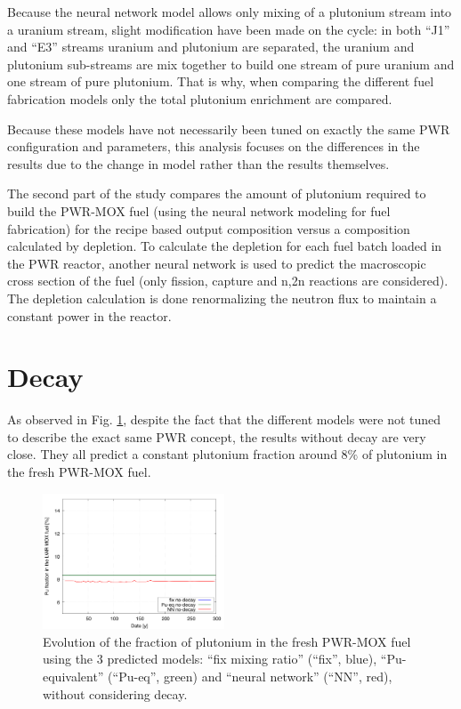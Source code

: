 \documentclass{anstrans}
\begin{document}
Because the neural network model allows only mixing of a plutonium stream into a
uranium stream, slight modification have been made on the cycle: in both ``J1''
and ``E3'' streams uranium and plutonium are separated, the uranium and
plutonium sub-streams are mix together to build one stream of pure uranium and
one stream of pure plutonium. That is why, when comparing the different fuel
fabrication models only the total plutonium enrichment are compared. 

Because these models have not necessarily been tuned on exactly the same
PWR configuration and parameters, this analysis focuses on the differences
in the results due to the change in model rather than the results themselves.

The second part of the study compares the amount of plutonium required to build
the PWR-MOX fuel (using the neural network modeling for fuel fabrication) for
the recipe based output composition versus a composition calculated by
depletion.  To calculate the depletion for each fuel batch loaded in the PWR
reactor, another neural network is used to predict the macroscopic cross section
of the fuel \cite{Leniau2015125} (only fission, capture and n,2n reactions are
considered). The depletion calculation is done renormalizing the neutron flux to
maintain a constant power in the reactor.

\section{Decay}


As observed in Fig. \ref{fig:nod}, despite the fact that the different models
were not tuned to describe the exact same PWR concept, the results without decay
are very close. They all predict a constant plutonium fraction around $8\%$ of
plutonium in the fresh PWR-MOX fuel.

\begin{figure}[ht] %
  \centering
  \includegraphics[width=0.48\textwidth]{nodecay_pu_contribution.png}
  \caption{Evolution of the fraction of plutonium in the fresh PWR-MOX fuel
  using the 3 predicted models: ``fix mixing ratio'' (``fix'', blue), ``Pu-equivalent''
  (``Pu-eq'', green) and ``neural network'' (``NN'', red), without considering decay.}
  \label{fig:nod}
\end{figure}
\end{document}
